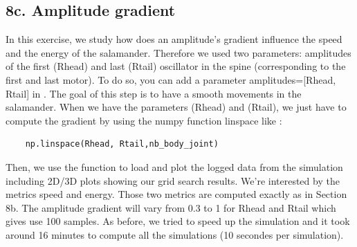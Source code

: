 \documentclass{cmc}
\begin{document}
\subsection*{8c. Amplitude gradient}
\label{sec:amplitude-gradient}
In this exercise, we study how does an amplitude's gradient influence the speed and the energy of the salamander. Therefore we used two parameters: amplitudes of the first (Rhead) and last
  (Rtail) oscillator in the spine (corresponding to the first and last
  motor). To do so, you can add a parameter amplitudes=[Rhead, Rtail] in
  . The goal of this step is to have a smooth movements in the salamander. When we have the parameters (Rhead) and (Rtail), we just have to compute the gradient by using the numpy function linspace like :
 \begin{lstlisting}
    np.linspace(Rhead, Rtail,nb_body_joint)
 \end{lstlisting}
 Then, we use the function  to load and plot the logged data from the simulation including 2D/3D plots showing our grid search results. We're interested by the metrics speed and energy. Those two metrics are computed exactly as in Section 8b. The amplitude gradient will vary from 0.3 to 1 for Rhead and Rtail which gives use 100 samples. As before, we tried to speed up the simulation and it took around 16 minutes to compute all the simulations (10 secondes per simulation).
\end{document}
